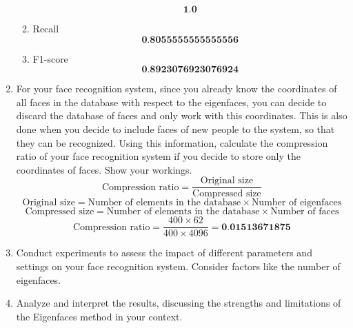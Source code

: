 \documentclass[12pt]{extarticle} %
\begin{document}
\begin{enumerate}
\begin{enumerate}
        \[
            \textbf{1.0}
        \]
        \item Recall
        \[
            \textbf{0.8055555555555556}
        \]
        \item F1-score
        \[
        \textbf{0.8923076923076924}
        \]
    \end{enumerate}
    \item For your face recognition system, since you already know the coordinates of all faces in the database
    with respect to the eigenfaces, you can decide to discard the database of faces and only work with this
    coordinates. This is also done when you decide to include faces of new people to the system, so that
    they can be recognized. Using this information, calculate the compression ratio of your face recognition
    system if you decide to store only the coordinates of faces. Show your workings.
    \[
    \text{Compression ratio} = \frac{\text{Original size}}{\text{Compressed size}}
    \]
    \[
    \text{Original size} = \text{Number of elements in the database} \times \text{Number of eigenfaces}
    \]
    \[
    \text{Compressed size} = \text{Number of elements in the database} \times \text{Number of faces}
    \]
    \[
    \text{Compression ratio} = \frac{400 \times 62}{400 \times 4096} = \textbf{0.01513671875}
    \]
    \item Conduct experiments to assess the impact of different parameters and settings on your face recognition
    system. Consider factors like the number of eigenfaces.
    \item Analyze and interpret the results, discussing the strengths and limitations of the Eigenfaces method
    in your context.
\end{enumerate}
\end{document}
